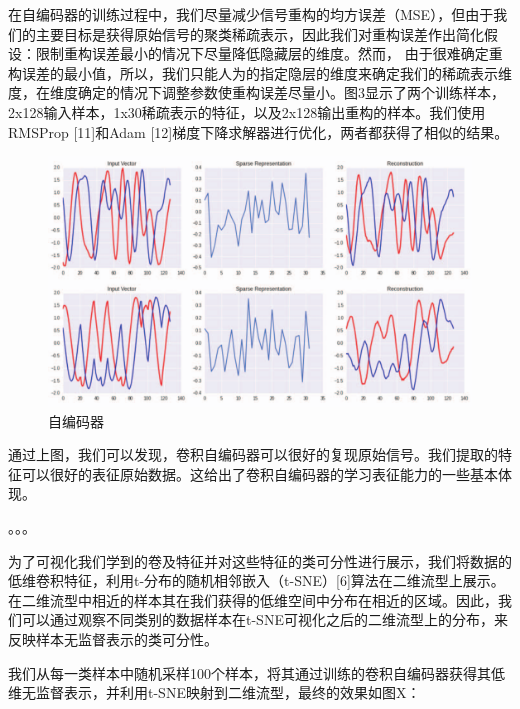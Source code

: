 在自编码器的训练过程中，我们尽量减少信号重构的均方误差（MSE），但由于我们的主要目标是获得原始信号的聚类稀疏表示，因此我们对重构误差作出简化假设：限制重构误差最小的情况下尽量降低隐藏层的维度。然而， 由于很难确定重构误差的最小值，所以，我们只能人为的指定隐层的维度来确定我们的稀疏表示维度，在维度确定的情况下调整参数使重构误差尽量小。图3显示了两个训练样本，2x128输入样本，1x30稀疏表示的特征，以及2x128输出重构的样本。我们使用RMSProp [11]和Adam [12]梯度下降求解器进行优化，两者都获得了相似的结果。\par

\begin{figure}[!h]
	\centering
	\includegraphics[scale=0.2]{figures/chapter_3/examples_cae}
	\caption{自编码器}	\label{fig_3_4}
\end{figure} 
通过上图，我们可以发现，卷积自编码器可以很好的复现原始信号。我们提取的特征可以很好的表征原始数据。这给出了卷积自编码器的学习表征能力的一些基本体现。\par。。。

为了可视化我们学到的卷及特征并对这些特征的类可分性进行展示，我们将数据的低维卷积特征，利用t-分布的随机相邻嵌入（t-SNE）[6]算法在二维流型上展示。在二维流型中相近的样本其在我们获得的低维空间中分布在相近的区域。因此，我们可以通过观察不同类别的数据样本在t-SNE可视化之后的二维流型上的分布，来反映样本无监督表示的类可分性。\par

我们从每一类样本中随机采样100个样本，将其通过训练的卷积自编码器获得其低维无监督表示，并利用t-SNE映射到二维流型，最终的效果如图X：

